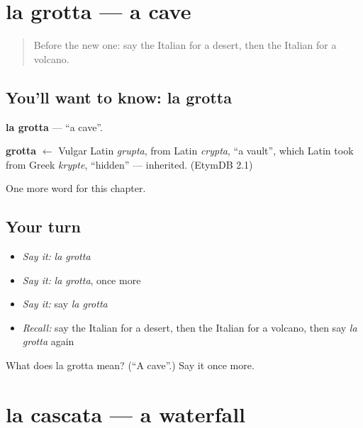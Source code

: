 \section[la grotta]{la grotta — a cave}

\label{lesson:IT-C119-grotta}



\begin{quote}
Before the new one: say the Italian for a desert, then the Italian for a volcano.
\end{quote}

\subsection*{You'll want to know: la grotta}
\textbf{la grotta} — \textquotedblleft{}a cave\textquotedblright{}.

\begin{cousinweb}
\textbf{grotta} $\leftarrow$ Vulgar Latin \emph{grupta}, from Latin \emph{crypta}, \textquotedblleft{}a vault\textquotedblright{}, which Latin took from Greek \emph{krypte}, \textquotedblleft{}hidden\textquotedblright{} — inherited. (EtymDB 2.1)
\end{cousinweb}

\begin{grammarlens}[title={What you've built}]
One more word for this chapter.
\end{grammarlens}

\subsection*{Your turn}
\begin{itemize}
\raggedright
  \item \emph{Say it:} \emph{la grotta}
  \item \emph{Say it:} \emph{la grotta}, once more
  \item \emph{Say it:} say \emph{la grotta}
  \item \emph{Recall:} say the Italian for a desert, then the Italian for a volcano, then say \emph{la grotta} again
\end{itemize}

\begin{tcolorbox}[breakable,colback=teal!4,colframe=teal!35!black,title={Before you move on}]
What does la grotta mean? (\textquotedblleft{}A cave\textquotedblright{}.) Say it once more.
\end{tcolorbox}
\section[la cascata]{la cascata — a waterfall}

